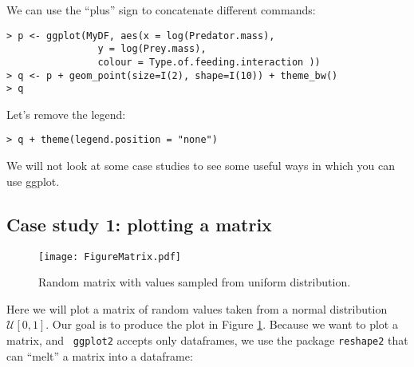 We can use the ``plus'' sign to concatenate different commands:

\begin{lstlisting}
> p <- ggplot(MyDF, aes(x = log(Predator.mass),
				y = log(Prey.mass),
				colour = Type.of.feeding.interaction ))
> q <- p + geom_point(size=I(2), shape=I(10)) + theme_bw()
> q
\end{lstlisting}

Let's remove the legend:

\begin{lstlisting}
> q + theme(legend.position = "none")
\end{lstlisting}

We will not look at some case studies to see some useful ways in which
you can use ggplot.

\subsection{Case study 1: plotting a matrix}
\begin{figure}
	\begin{center}
	\texttt{[image: FigureMatrix.pdf]}
	\end{center}
	\caption{Random matrix with values sampled from uniform
	distribution.}
	\label{MatPlot}
\end{figure}

Here we will plot a matrix of random values taken from a normal 
distribution $\mathcal U [0,1]$. Our goal is to produce the plot in 
Figure \ref{MatPlot}. Because we want to plot a matrix, and {\tt 
ggplot2} accepts only dataframes, we use the package {\tt reshape2} 
that can ``melt'' a matrix into a dataframe:

